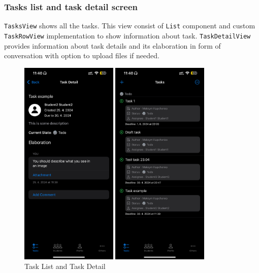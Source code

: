 \documentclass[
  biblatex,
  language=english,
  figures=false,
  sourcecodes,
  glossaries,
  index
]{kidiplom}
\begin{document}
\subsubsection{Tasks list and task detail screen}
\texttt{TasksView} shows all the tasks. This view consist of \texttt{List} component and custom \texttt{TaskRowView} implementation to show information about task.
\texttt{TaskDetailView} provides information about task details and its elaboration in form of conversation with option to upload files if needed.

\begin{figure}[ht]
\centering
\begin{minipage}[b]{0.4\textwidth}
	\includegraphics[height=10cm]{image8}
\end{minipage}
\begin{minipage}[b]{0.4\textwidth}
	\includegraphics[height=10cm]{image9}
\end{minipage}
\caption{Task List and Task Detail}
\label{fig:image8-9}
\end{figure}
\end{document}
